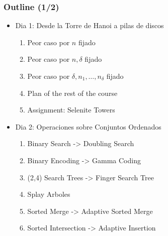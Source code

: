 \documentclass{beamer}
\begin{document}
\begin{frame}
  \frametitle{Outline (1/2)}
\begin{itemize}
\item {Dia 1: Desde la Torre de Hanoi a pilas de discos}
\label{sec-1}
\begin{enumerate}
\item Peor caso por \(n\) fijado
\item Peor caso por \(n,\delta\) fijado
\item Peor caso por \(\delta,n_1,\ldots,n_\delta\) fijado
\item Plan of the rest of the course
\item Assignment: Selenite Towers
\end{enumerate}
\vfill
\item {Dia 2: Operaciones sobre Conjuntos Ordenados}
\label{sec-2}
\begin{enumerate}
\item Binary Search -> Doubling Search
\item Binary Encoding -> Gamma Coding
\item (2,4) Search Trees -> Finger Search Tree
\item Splay Arboles
\item Sorted Merge -> Adaptive Sorted Merge
\item Sorted Intersection -> Adaptive Insertion
\end{enumerate}
\end{itemize}
\end{frame}
\end{document}
